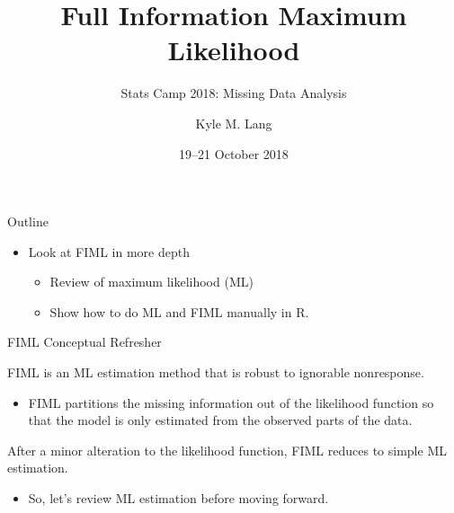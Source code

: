 \documentclass{beamer}\usepackage[]{graphicx}\usepackage[]{color}
\title{Full Information Maximum Likelihood}
\subtitle{Stats Camp 2018: Missing Data Analysis}
\author{Kyle M. Lang}
\institute{Department of Methodology \& Statistics\\Tilburg University}
\date{19--21 October 2018}
\begin{document}




\begin{frame}[t,plain]

  \titlepage

\end{frame}


\begin{frame}{Outline}

  \begin{itemize}
  \item Look at FIML in more depth
    \va
    \begin{itemize}
    \item Review of maximum likelihood (ML)
    \item Show how to do ML and FIML manually in \textsf{R}.
    \end{itemize}
  \end{itemize}
    
\end{frame}


\begin{frame}{FIML Conceptual Refresher}

  FIML is an ML estimation method that is robust to ignorable nonresponse.
  \vc
  \begin{itemize}
  \item FIML partitions the missing information out of the likelihood function 
    so that the model is only estimated from the observed parts of the data.
  \end{itemize}
  \vb
  After a minor alteration to the likelihood function, FIML reduces to simple ML 
  estimation.
  \vc
  \begin{itemize}
  \item So, let's review ML estimation before moving forward.
  \end{itemize}
  
\end{frame}

\end{document}

